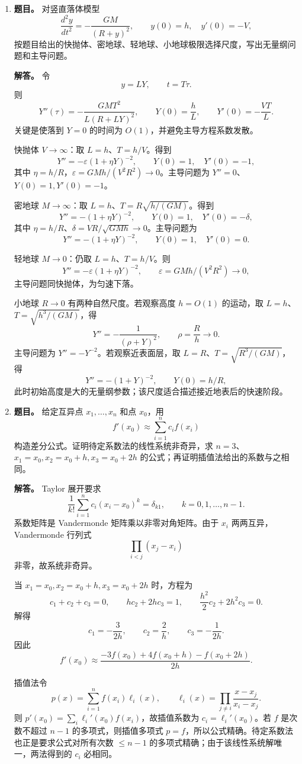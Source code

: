 ﻿\documentclass[UTF8,12pt]{ctexart}
\begin{document}
\begin{enumerate}[label=\textbf{\arabic*.},leftmargin=2.2em]
\item \textbf{题目。} 对竖直落体模型
\[
\frac{d^2y}{dt^2}=-\frac{GM}{(R+y)^2},\qquad y(0)=h,\quad y'(0)=-V,
\]
按题目给出的快抛体、密地球、轻地球、小地球极限选择尺度，写出无量纲问题和主导问题。

\textbf{解答。} 令
\[
y=L Y,\qquad t=T\tau.
\]
则
\[
Y''(\tau)=-\frac{GM T^2}{L(R+LY)^2},\qquad
Y(0)=\frac hL,\qquad Y'(0)=-\frac{VT}{L}.
\]
关键是使落到 \(Y=0\) 的时间为 \(O(1)\)，并避免主导方程系数发散。

快抛体 \(V\to\infty\)：取 \(L=h\)、\(T=h/V\)。得到
\[
Y''=-\varepsilon(1+\eta Y)^{-2},\qquad
Y(0)=1,\quad Y'(0)=-1,
\]
其中 \(\eta=h/R\)，\(\varepsilon=GMh/(V^2R^2)\to0\)。主导问题为 \(Y''=0\)、\(Y(0)=1,Y'(0)=-1\)。

密地球 \(M\to\infty\)：取 \(L=h\)、\(T=R\sqrt{h/(GM)}\)。得到
\[
Y''=-(1+\eta Y)^{-2},\qquad
Y(0)=1,\quad Y'(0)=-\delta,
\]
其中 \(\eta=h/R\)、\(\delta=VR/\sqrt{GMh}\to0\)。主导问题为
\[
Y''=-(1+\eta Y)^{-2},\qquad Y(0)=1,\quad Y'(0)=0.
\]

轻地球 \(M\to0\)：仍取 \(L=h\)、\(T=h/V\)。则
\[
Y''=-\varepsilon(1+\eta Y)^{-2},\qquad \varepsilon=GMh/(V^2R^2)\to0,
\]
主导问题同快抛体，为匀速下落。

小地球 \(R\to0\) 有两种自然尺度。若观察高度 \(h=O(1)\) 的运动，取 \(L=h\)、\(T=\sqrt{h^3/(GM)}\)，得
\[
Y''=-\frac1{(\rho+Y)^2},\qquad
\rho=\frac Rh\to0.
\]
主导问题为 \(Y''=-Y^{-2}\)。若观察近表面层，取 \(L=R\)、\(T=\sqrt{R^3/(GM)}\)，得
\[
Y''=-(1+Y)^{-2},\qquad Y(0)=h/R,
\]
此时初始高度是大的无量纲参数；该尺度适合描述接近地表后的快速阶段。

\item \textbf{题目。} 给定互异点 \(x_1,\ldots,x_n\) 和点 \(x_0\)，用
\[
f'(x_0)\approx \sum_{i=1}^n c_i f(x_i)
\]
构造差分公式。证明待定系数法的线性系统非奇异，求 \(n=3\)、\(x_1=x_0,x_2=x_0+h,x_3=x_0+2h\) 的公式；再证明插值法给出的系数与之相同。

\textbf{解答。} Taylor 展开要求
\[
\frac1{k!}\sum_{i=1}^n c_i(x_i-x_0)^k=\delta_{k1},
\qquad k=0,1,\ldots,n-1.
\]
系数矩阵是 Vandermonde 矩阵乘以非零对角矩阵。由于 \(x_i\) 两两互异，Vandermonde 行列式
\[
\prod_{i<j}(x_j-x_i)
\]
非零，故系统非奇异。

当 \(x_1=x_0,x_2=x_0+h,x_3=x_0+2h\) 时，方程为
\[
c_1+c_2+c_3=0,\qquad
h c_2+2h c_3=1,\qquad
\frac{h^2}{2}c_2+2h^2 c_3=0.
\]
解得
\[
c_1=-\frac3{2h},\qquad c_2=\frac2h,\qquad c_3=-\frac1{2h}.
\]
因此
\[
f'(x_0)\approx \frac{-3f(x_0)+4f(x_0+h)-f(x_0+2h)}{2h}.
\]

插值法令
\[
p(x)=\sum_{i=1}^n f(x_i)\ell_i(x),\qquad
\ell_i(x)=\prod_{j\ne i}\frac{x-x_j}{x_i-x_j}.
\]
则 \(p'(x_0)=\sum_i \ell_i'(x_0)f(x_i)\)，故插值系数为 \(c_i=\ell_i'(x_0)\)。若 \(f\) 是次数不超过 \(n-1\) 的多项式，则插值多项式 \(p=f\)，所以公式精确。待定系数法也正是要求公式对所有次数 \(\le n-1\) 的多项式精确；由于该线性系统解唯一，两法得到的 \(c_i\) 必相同。


\end{enumerate}
\end{document}
